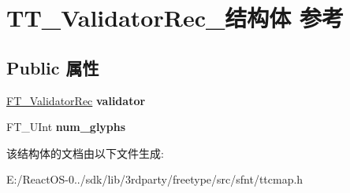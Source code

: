 \hypertarget{struct_t_t___validator_rec__}{}\section{T\+T\+\_\+\+Validator\+Rec\+\_\+结构体 参考}
\label{struct_t_t___validator_rec__}
\subsection*{Public 属性}
\begin{DoxyCompactItemize}
\item 
\mbox{\label{struct_t_t___validator_rec___a9faa8add892ddf72fdadae3a53a87e14}} 
\hyperlink{struct_f_t___validator_rec__}{F\+T\+\_\+\+Validator\+Rec} {\bfseries validator}
\item 
\mbox{\label{struct_t_t___validator_rec___adfacba73a1fc72ab51d5a34a6366bb52}} 
F\+T\+\_\+\+U\+Int {\bfseries num\+\_\+glyphs}
\end{DoxyCompactItemize}


该结构体的文档由以下文件生成\+:\begin{DoxyCompactItemize}
\item 
E\+:/\+React\+O\+S-\/0../sdk/lib/3rdparty/freetype/src/sfnt/ttcmap.\+h\end{DoxyCompactItemize}
